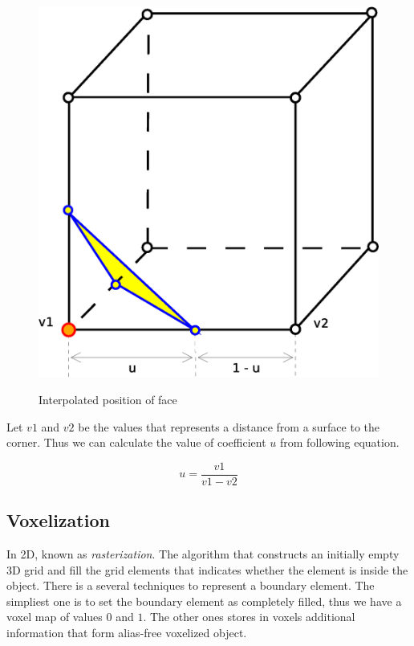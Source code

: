 \begin{figure}[!htbp]
\centering
\includegraphics[scale=0.35]{../img/marc_cub_inter.eps}
\label{fig:mc_interpolation}
\caption{Interpolated position of face}
\end{figure}

Let $v1$ and $v2$ be the values that represents a distance from a surface to the corner.
Thus we can calculate the value of coefficient $u$ from following equation.

\begin{equation}
u = \frac{v1}{v1-v2}
\end{equation}


\subsection{Voxelization}
\label{sub:vox}

In 2D, known as \emph{rasterization}. The algorithm that constructs an initially empty 3D grid and fill 
the
grid elements that indicates whether the element is inside the object\cite{Cohen-Or1995}. There is a several techniques
to represent a boundary element. The simpliest one is to set the boundary element as completely filled, 
thus we have a voxel map of values $0$ and $1$. The other ones stores in voxels additional
information that form alias-free voxelized object. \cite{Wang1993}\\

